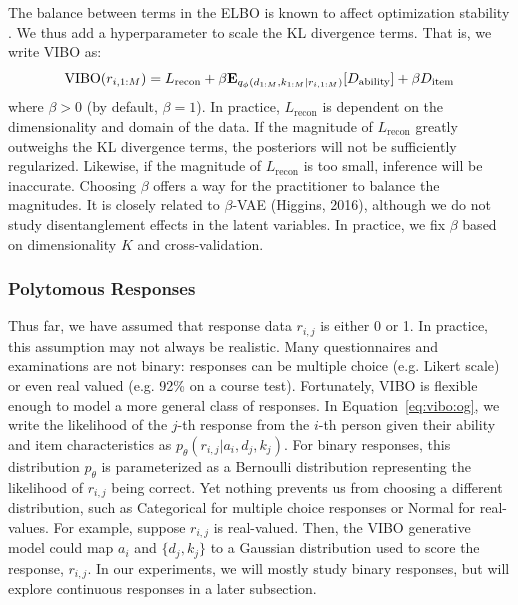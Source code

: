 The balance between terms in the ELBO is known to affect optimization stability \cite{higgins2016beta}.
We thus add a hyperparameter to scale the \textup{KL} divergence terms. That is, we write VIBO as:
\begin{equation}
    \textup{VIBO}({r}_{i,1:M}) = L_{\text{recon}} + \beta\mathbf{E}_{q_\phi({d}_{1:M}, k_{1:M}|{r}_{i,1:M})}[D_{\text{ability}}] + \beta D_{\text{item}}
    \label{eq:betareg}
\end{equation}
where $\beta > 0$ (by default, $\beta = 1$). In practice, $L_{\text{recon}}$ is dependent on the dimensionality and domain of the data.
If the magnitude of $L_{\text{recon}}$ greatly outweighs the \textup{KL} divergence terms, the posteriors will not be sufficiently regularized.
Likewise, if the magnitude of $L_{\text{recon}}$ is too small, inference will be inaccurate.
Choosing $\beta$ offers a way for the practitioner to balance the magnitudes. 
It is closely related to $\beta$-VAE (Higgins, 2016), although we do not study disentanglement effects in the latent variables.
In practice, we fix $\beta$ based on dimensionality $K$ and cross-validation.

\subsubsection{Polytomous Responses}

Thus far, we have assumed that response data $r_{i,j}$ is either 0 or 1.
In practice, this assumption may not always be realistic. Many questionnaires and examinations are not binary: responses can be multiple choice (e.g. Likert scale) or even real valued (e.g. 92\% on a course test).
Fortunately, VIBO is flexible enough to model a more general class of responses. 
In Equation~\ref{eq:vibo:og}, we write the likelihood of the $j$-th response from the $i$-th person given their ability and item characteristics as $p_\theta(r_{i,j}|{a}_i, {d}_{j}, k_j)$. 
For binary responses, this distribution $p_\theta$ is parameterized as a Bernoulli distribution representing the likelihood of $r_{i,j}$ being correct. 
Yet nothing prevents us from choosing a different distribution, such as Categorical for multiple choice responses or Normal for real-values.
For example, suppose $r_{i,j}$ is real-valued. Then, the VIBO generative model could map ${a}_i$ and $\{{d}_{j}, k_j\}$ to a Gaussian distribution used to score the response, $r_{i,j}$. 
In our experiments, we will mostly study binary responses, but will explore continuous responses in a later subsection.

